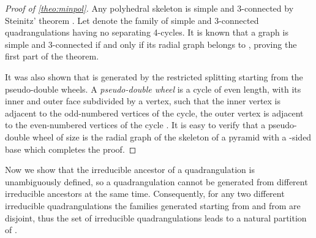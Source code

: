 \documentclass[]{article}
\begin{document}
\begin{proof}[Proof of \autoref*{theo:minpol}]
Any polyhedral skeleton is simple and 3-connected by Steinitz' theorem \cite{Mohar2001}.
Let  denote the family of simple and 3-connected quadrangulations having no separating 4-cycles.
It is known \cite{Brinkmann2005} that a graph is simple and 3-connected if and only if its radial graph belongs to , proving the first part of the theorem.

It was also shown \cite{Brinkmann2005} that  is generated by the restricted splitting  starting from the pseudo-double wheels.
A \emph{pseudo-double wheel} is a cycle of even length, with its inner and outer face subdivided by a vertex, such that the inner vertex is adjacent to the odd-numbered vertices of the cycle, the outer vertex is adjacent to the even-numbered vertices of the cycle \cite{Brinkmann2007}.
It is easy to verify that a pseudo-double wheel of size  is the radial graph of the skeleton of a pyramid with a -sided base which completes the proof.
\end{proof}

Now we show that the irreducible ancestor of a quadrangulation is unambiguously defined, so a quadrangulation cannot be generated from different irreducible ancestors at the same time.
Consequently, for any two different irreducible quadrangulations  the families generated starting from  and from  are disjoint, thus the set of irreducible quadrangulations leads to a natural partition of .
\end{document}
